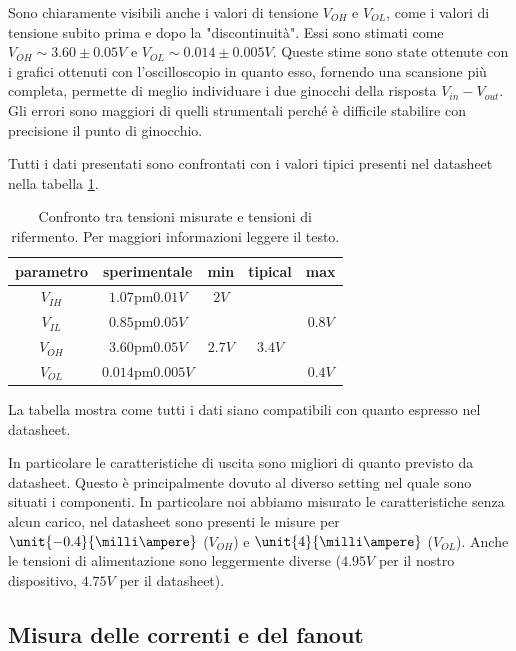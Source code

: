 \documentclass[a4paper,10pt]{article}
\begin{document}
Sono chiaramente visibili anche i valori di tensione $V_{OH}$ e $V_{OL}$, come i valori di tensione subito prima e dopo la "discontinuità". Essi sono stimati come $V_{OH}\sim 3.60 \pm 0.05 V$ e $V_{OL}\sim 0.014 \pm 0.005 V$. Queste stime sono state ottenute con i grafici ottenuti con l'oscilloscopio in quanto esso, fornendo una scansione più completa, permette di meglio individuare i due ginocchi della risposta $V_{in} - V_{out}$. Gli errori sono maggiori di quelli strumentali perché è difficile stabilire con precisione il punto di ginocchio. 

Tutti i dati presentati sono confrontati con i valori tipici presenti nel datasheet nella tabella \ref{Vresults}.

 \begin{table}[H]
	\centering
	\begin{tabular}{c|c|c|c|c}
		parametro & sperimentale & min & tipical & max\\		
		\hline
		$V_{IH}$ & $\unit{1.07 \pm 0.01}{V}$ & $\unit{2}{V}$&&\\
		$V_{IL}$ & $\unit{0.85 \pm 0.05}{V}$ &&& $\unit{0.8}{V}$ \\
		$V_{OH}$ & $\unit{3.60 \pm 0.05}{V}$ &$\unit{2.7}{V}$&$\unit{3.4}{V}$&\\
		$V_{OL}$ & $\unit{0.014 \pm 0.005}{V}$ &&&$\unit{0.4}{V}$ \\
		\hline
	\end{tabular}
	\caption{Confronto tra tensioni misurate e tensioni di rifermento. Per maggiori informazioni leggere il testo.}
	\label{Vresults}
\end{table}

\noindent La tabella mostra come tutti i dati siano compatibili con quanto espresso nel datasheet.

In particolare le caratteristiche di uscita sono migliori di quanto previsto da datasheet.
Questo è principalmente dovuto al diverso setting nel quale sono situati i componenti. In particolare noi abbiamo misurato le caratteristiche senza alcun carico, nel datasheet sono presenti le misure per $\unit{-0.4}{\milli\ampere}$ ($V_{OH}$) e $\unit{4}{\milli\ampere}$ ($V_{OL}$). Anche le tensioni di alimentazione sono leggermente diverse ($\unit{4.95}{V}$ per il nostro dispositivo, $\unit{4.75}{V}$ per il datasheet).


\subsection{Misura delle correnti e del fanout}
\end{document}
